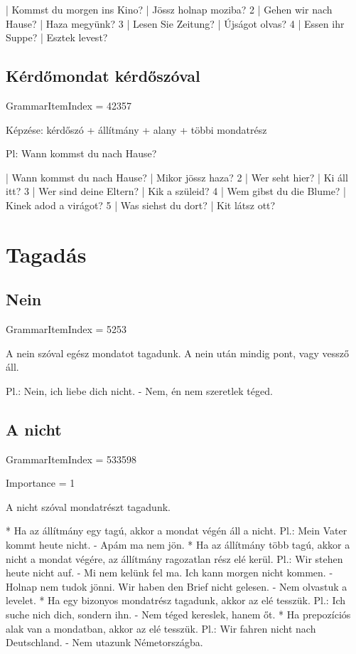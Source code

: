 \documentclass{article}
\newenvironment{desc}{\verbatim}{\endverbatim}
\newenvironment{exmp}{\verbatim}{\endverbatim}
\begin{document}
\begin{exmp}
1 | Kommst du morgen ins Kino? | Jössz holnap moziba?
2 | Gehen wir nach Hause? | Haza megyünk?
3 | Lesen Sie Zeitung? | Újságot olvas?
4 | Essen ihr Suppe? | Esztek levest?
\end{exmp}

\subsection{Kérdőmondat kérdőszóval}

GrammarItemIndex = 42357

\begin{desc}
Képzése: kérdőszó + állítmány + alany + többi mondatrész

Pl: Wann kommst du nach Hause?
\end{desc}

\begin{exmp}
1 | Wann kommst du nach Hause? | Mikor jössz haza?
2 | Wer seht hier? | Ki áll itt?
3 | Wer sind deine Eltern? | Kik a szüleid?
4 | Wem gibst du die Blume? | Kinek adod a virágot?
5 | Was siehst du dort? | Kit látsz ott?
\end{exmp}

\section{Tagadás}

\subsection{Nein}

GrammarItemIndex = 5253

\begin{desc}
A nein szóval egész mondatot tagadunk. A nein után mindig pont, vagy vessző áll.

Pl.: Nein, ich liebe dich nicht. - Nem, én nem szeretlek téged.
\end{desc}

\subsection{A nicht}

GrammarItemIndex = 533598

Importance = 1

\begin{desc}
A nicht szóval mondatrészt tagadunk.

* Ha az állítmány egy tagú, akkor a mondat végén áll a nicht.
  Pl.: Mein Vater kommt heute nicht. - Apám ma nem jön.
* Ha az állítmány több tagú, akkor a nicht a mondat végére, az állítmány ragozatlan rész elé kerül.
  Pl.: Wir stehen heute nicht auf. - Mi nem kelünk fel ma.
       Ich kann morgen nicht kommen. - Holnap nem tudok jönni.
       Wir haben den Brief nicht gelesen. - Nem olvastuk a levelet.
* Ha egy bizonyos mondatrész tagadunk, akkor az elé tesszük.
  Pl.: Ich suche nich dich, sondern ihn. - Nem téged kereslek, hanem őt.
* Ha prepozíciós alak van a mondatban, akkor az elé tesszük.
  Pl.: Wir fahren nicht nach Deutschland. - Nem utazunk Németországba.
\end{desc}
\end{document}
